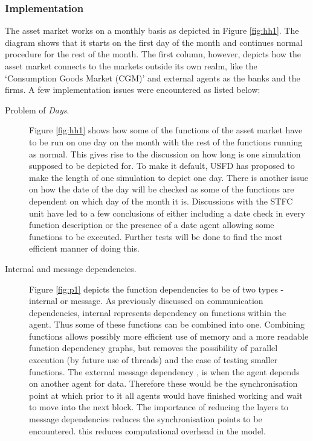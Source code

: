 \documentclass[a4paper,11pt]{article}
\begin{document}
\subsubsection{Implementation}
The asset market works on a monthly basis as depicted in Figure
\ref{fig:hh1}. The diagram shows that it starts on the first day of
the month and continues normal procedure for the rest of the month.
The first column, however, depicts how the asset market connects to
the markets outside its own realm, like the `Consumption Goods
Market (CGM)' and external agents as the banks and the firms. A few
implementation issues were encountered as listed below:
\begin{description}
\item[Problem of \emph{Days}.] Figure \ref{fig:hh1} shows how some
of the functions of the asset market have to be run on one day on
the month with the rest of the functions running as normal. \subitem
This gives rise to the discussion on how long is one simulation
supposed to be depicted for. To make it default, USFD has proposed
to make the length of one simulation to depict one day. \subitem
There is another issue on how the date of the day will be checked as
some of the functions are dependent on which day of the month it is.
Discussions with the STFC unit have led to a few conclusions of
either including a date check in every function description or the presence of a date agent allowing some functions to be
executed. Further tests will be done to find the most efficient
manner of doing this.
\item[Internal and message dependencies.] Figure \ref{fig:p1} depicts the function
dependencies to be of two types - {internal} or {message}. As
previously discussed on communication dependencies, internal
represents dependency on functions within the agent. Thus some of
these functions can be combined into one.
Combining functions allows possibly more efficient use of memory and a more readable function dependency graphs, but removes the possibility of parallel execution (by future use of threads) and the ease of testing smaller functions.
The external {message} dependency
, is when the agent depends on another agent for data.
Therefore these would be the synchronisation point at which prior to
it all agents would have finished working and wait to move into the
next block. The importance of reducing the layers to {message}
dependencies reduces the synchronisation points to be encountered.
this reduces computational overhead in the model.

\end{description}
\end{document}
